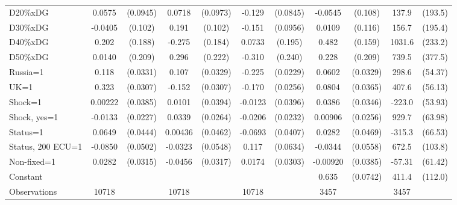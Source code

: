 \begin{tabular}{l|cccccc|cc|cc}
D20\%xDG        &   0.0575         & (0.0945)&   0.0718         & (0.0973)&   -0.129         & (0.0845)&  -0.0545         &  (0.108)&    137.9         &  (193.5)\\
D30\%xDG        &  -0.0405         &  (0.102)&    0.191\sym{*}  &  (0.102)&   -0.151         & (0.0956)&   0.0109         &  (0.116)&    156.7         &  (195.4)\\
D40\%xDG        &    0.202         &  (0.188)&   -0.275         &  (0.184)&   0.0733         &  (0.195)&    0.482\sym{***}&  (0.159)&   1031.6\sym{***}&  (233.2)\\
D50\%xDG        &   0.0140         &  (0.209)&    0.296         &  (0.222)&   -0.310         &  (0.240)&    0.228         &  (0.209)&    739.5\sym{*}  &  (377.5)\\
Russia=1        &    0.118\sym{***}& (0.0331)&    0.107\sym{***}& (0.0329)&   -0.225\sym{***}& (0.0229)&   0.0602\sym{*}  & (0.0329)&    298.6\sym{***}&  (54.37)\\
UK=1            &    0.323\sym{***}& (0.0307)&   -0.152\sym{***}& (0.0307)&   -0.170\sym{***}& (0.0256)&   0.0804\sym{**} & (0.0365)&    407.6\sym{***}&  (56.13)\\
Shock=1         &  0.00222         & (0.0385)&   0.0101         & (0.0394)&  -0.0123         & (0.0396)&   0.0386         & (0.0346)&   -223.0\sym{***}&  (53.93)\\
Shock, yes=1    &  -0.0133         & (0.0227)&   0.0339         & (0.0264)&  -0.0206         & (0.0232)&  0.00906         & (0.0256)&    929.7\sym{***}&  (63.98)\\
Status=1        &   0.0649         & (0.0444)&  0.00436         & (0.0462)&  -0.0693\sym{*}  & (0.0407)&   0.0282         & (0.0469)&   -315.3\sym{***}&  (66.53)\\
Status, 200 ECU=1&  -0.0850\sym{*}  & (0.0502)&  -0.0323         & (0.0548)&    0.117\sym{*}  & (0.0634)&  -0.0344         & (0.0558)&    672.5\sym{***}&  (103.8)\\
Non-fixed=1     &   0.0282         & (0.0315)&  -0.0456         & (0.0317)&   0.0174         & (0.0303)& -0.00920         & (0.0385)&   -57.31         &  (61.42)\\
Constant        &                  &         &                  &         &                  &         &    0.635\sym{***}& (0.0742)&    411.4\sym{***}&  (112.0)\\
\hline
Observations    &    10718         &         &    10718         &         &    10718         &         &     3457         &         &     3457         &         \\

\end{tabular}
